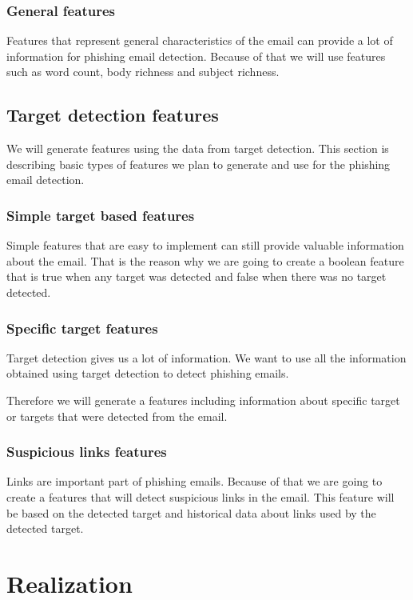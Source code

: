 \documentclass[thesis=B,english]{FITthesis}[2012/10/20]
\begin{document}
\subsection{General features}
Features that represent general characteristics of the email can provide a lot of information for phishing email detection. Because of that we will use features such as word count, body richness and subject richness. 


\section{Target detection features}
We will generate features using the data from target detection. This section is describing basic types of features we plan to generate and use for the phishing email detection.
\subsection{Simple target based features}
\par Simple features that are easy to implement can still provide valuable information about the email. That is the reason why we are going to create a boolean feature that is true when any target was detected and false when there was no target detected. 
\subsection{Specific target features}
\par Target detection gives us a lot of information. We want to use all the information obtained using target detection to detect phishing emails.
\par Therefore we will generate a features including information about specific target or targets that were detected from the email. 
\subsection{Suspicious links features}
\par Links are important part of phishing emails. Because of that we are going to create a features that will detect suspicious links in the email. This feature will be based on the detected target and historical data about links used by the detected target.




\chapter{Realization}
\end{document}
